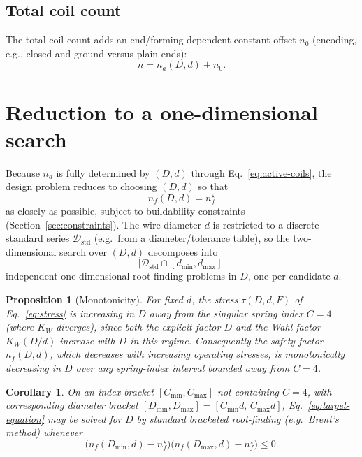 \documentclass[11pt]{article}
\newtheorem{proposition}{Proposition}
\newtheorem{corollary}{Corollary}
\begin{document}
\subsection{Total coil count}

The total coil count adds an end/forming-dependent constant offset
$n_0$ (encoding, e.g., closed-and-ground versus plain ends):
\begin{equation}
n = n_a(D,d) + n_0 .
\label{eq:total-coils}
\end{equation}

\section{Reduction to a one-dimensional search}
\label{sec:reduction}

Because $n_a$ is fully determined by $(D,d)$ through
Eq.~\eqref{eq:active-coils}, the design problem reduces to choosing
$(D,d)$ so that
\begin{equation}
n_f(D,d) = n_f^{\star}
\label{eq:target-equation}
\end{equation}
as closely as possible, subject to buildability constraints
(Section~\ref{sec:constraints}). The wire diameter $d$ is restricted to a
discrete standard series $\mathcal{D}_{\mathrm{std}}$ (e.g.\ from a
diameter/tolerance table), so the two-dimensional search over $(D,d)$
decomposes into
\[
|\mathcal{D}_{\mathrm{std}} \cap [d_{\min}, d_{\max}]|
\]
independent one-dimensional root-finding problems in $D$, one per
candidate $d$.

\begin{proposition}[Monotonicity]
\label{prop:monotonic}
For fixed $d$, the stress $\tau(D,d,F)$ of Eq.~\eqref{eq:stress} is
increasing in $D$ away from the singular spring index $C=4$ (where $K_W$
diverges), since both the explicit factor $D$ and the Wahl factor
$K_W(D/d)$ increase with $D$ in this regime. Consequently the safety
factor $n_f(D,d)$, which decreases with increasing operating stresses, is
monotonically decreasing in $D$ over any spring-index interval bounded
away from $C=4$.
\end{proposition}

\begin{corollary}
On an index bracket $[C_{\min},C_{\max}]$ not containing $C=4$, with
corresponding diameter bracket $[D_{\min},D_{\max}] = [C_{\min}d,\,
C_{\max}d]$, Eq.~\eqref{eq:target-equation} may be solved for $D$ by
standard bracketed root-finding (e.g.\ Brent's method) whenever
\begin{equation}
\big(n_f(D_{\min},d) - n_f^{\star}\big)\big(n_f(D_{\max},d) - n_f^{\star}\big) \le 0 .
\label{eq:bracket-condition}
\end{equation}
\end{corollary}
\end{document}
